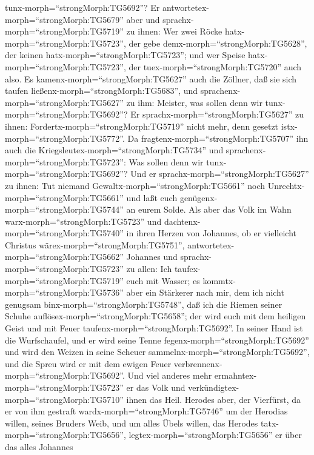 tunx-morph=``strongMorph:TG5692''?  Er
antwortetex-morph=``strongMorph:TG5679'' aber und
sprachx-morph=``strongMorph:TG5719'' zu ihnen: Wer zwei Röcke
hatx-morph=``strongMorph:TG5723'', der gebe
demx-morph=``strongMorph:TG5628'', der keinen
hatx-morph=``strongMorph:TG5723''; und wer Speise
hatx-morph=``strongMorph:TG5723'', der tuex-morph=``strongMorph:TG5720''
auch also.  Es kamenx-morph=``strongMorph:TG5627'' auch die
Zöllner, daß sie sich taufen ließenx-morph=``strongMorph:TG5683'', und
sprachenx-morph=``strongMorph:TG5627'' zu ihm: Meister, was sollen denn
wir tunx-morph=``strongMorph:TG5692''?  Er
sprachx-morph=``strongMorph:TG5627'' zu ihnen:
Fordertx-morph=``strongMorph:TG5719'' nicht mehr, denn gesetzt
istx-morph=``strongMorph:TG5772''.  Da
fragtenx-morph=``strongMorph:TG5707'' ihn auch die
Kriegsleutex-morph=``strongMorph:TG5734'' und
sprachenx-morph=``strongMorph:TG5723'': Was sollen denn wir
tunx-morph=``strongMorph:TG5692''? Und er
sprachx-morph=``strongMorph:TG5627'' zu ihnen: Tut niemand
Gewaltx-morph=``strongMorph:TG5661'' noch
Unrechtx-morph=``strongMorph:TG5661'' und laßt euch
genügenx-morph=``strongMorph:TG5744'' an eurem Solde.  Als
aber das Volk im Wahn warx-morph=``strongMorph:TG5723'' und
dachtenx-morph=``strongMorph:TG5740'' in ihren Herzen von Johannes, ob
er vielleicht Christus wärex-morph=``strongMorph:TG5751'', 
antwortetex-morph=``strongMorph:TG5662'' Johannes und
sprachx-morph=``strongMorph:TG5723'' zu allen: Ich
taufex-morph=``strongMorph:TG5719'' euch mit Wasser; es
kommtx-morph=``strongMorph:TG5736'' aber ein Stärkerer nach mir, dem ich
nicht genugsam binx-morph=``strongMorph:TG5748'', daß ich die Riemen
seiner Schuhe auflösex-morph=``strongMorph:TG5658''; der wird euch mit
dem heiligen Geist und mit Feuer taufenx-morph=``strongMorph:TG5692''.
 In seiner Hand ist die Wurfschaufel, und er wird seine
Tenne fegenx-morph=``strongMorph:TG5692'' und wird den Weizen in seine
Scheuer sammelnx-morph=``strongMorph:TG5692'', und die Spreu wird er mit
dem ewigen Feuer verbrennenx-morph=``strongMorph:TG5692''. 
Und viel anderes mehr ermahntex-morph=``strongMorph:TG5723'' er das Volk
und verkündigtex-morph=``strongMorph:TG5710'' ihnen das Heil.
 Herodes aber, der Vierfürst, da er von ihm gestraft
wardx-morph=``strongMorph:TG5746'' um der Herodias willen, seines
Bruders Weib, und um alles Übels willen, das Herodes
tatx-morph=``strongMorph:TG5656'', 
legtex-morph=``strongMorph:TG5656'' er über das alles Johannes
